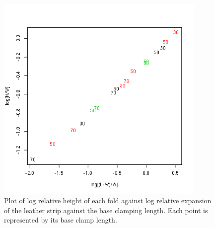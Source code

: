 %

\begin{figure}[!h]
  \centering
   \includegraphics[width=0.9\textwidth]{logHLplot.png}
  \caption{Plot of log relative height of each fold against log relative expansion of the leather strip against the base clamping length. Each point is represented by its base clamp length.}
  \label{fig:loghlplot}
\end{figure}

%

